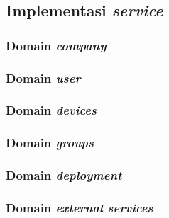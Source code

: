 \subsection{Implementasi \textit{service}}

\subsubsection{Domain \textit{company}}
\subsubsection{Domain \textit{user}}
\subsubsection{Domain \textit{devices}}
\subsubsection{Domain \textit{groups}}
\subsubsection{Domain \textit{deployment}}
\subsubsection{Domain \textit{external services}}